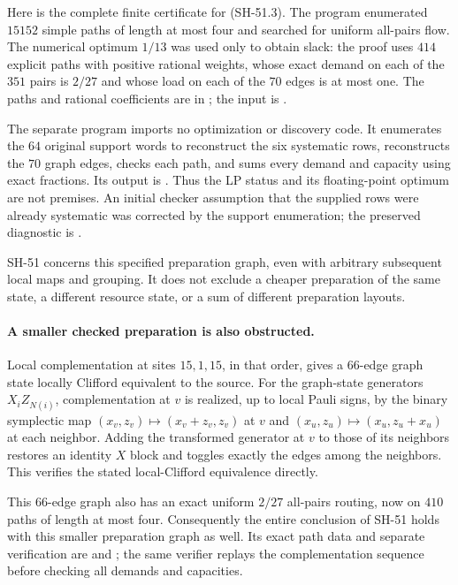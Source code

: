 Here is the complete finite certificate for (SH-51.3).
The program 
enumerated $15152$ simple paths of length at most four and
searched for uniform all-pairs flow.  The numerical optimum
$1/13$ was used only to obtain slack: the proof uses $414$
explicit paths with positive rational weights, whose
exact demand on each of the $351$ pairs is $2/27$ and whose
load on each of the $70$ edges is at most one.  The paths
and rational coefficients are in
; the input is
.

The separate program
imports no optimization or discovery code.  It enumerates
the $64$ original support words to reconstruct the six
systematic rows, reconstructs the $70$ graph edges, checks
each path, and sums every demand and capacity using exact
fractions.  Its output is
.
Thus the LP status and its floating-point optimum are not
premises.  An initial checker assumption that the supplied
rows were already systematic was corrected by the support
enumeration; the preserved diagnostic is
.

SH-51 concerns this specified preparation graph, even with
arbitrary subsequent local maps and grouping.  It does not
exclude a cheaper preparation of the same state, a different
resource state, or a sum of different preparation layouts.

\paragraph{A smaller checked preparation is also obstructed.}
Local complementation at sites $15,1,15$, in that order,
gives a $66$-edge graph state locally Clifford equivalent
to the source.  For the graph-state generators $X_iZ_{N(i)}$,
complementation at $v$ is realized, up to local Pauli signs,
by the binary symplectic map $(x_v,z_v)\mapsto(x_v+z_v,z_v)$
at $v$ and $(x_u,z_u)\mapsto(x_u,z_u+x_u)$ at each neighbor.
Adding the transformed generator at $v$ to those of its
neighbors restores an identity $X$ block and toggles exactly
the edges among the neighbors.  This verifies the stated
local-Clifford equivalence directly.

This $66$-edge graph also has an exact uniform $2/27$
all-pairs routing, now on $410$ paths of length at most four.
Consequently the entire conclusion of SH-51 holds with this
smaller preparation graph as well.  Its exact path data and
separate verification are
 and
;
the same verifier replays the complementation sequence before
checking all demands and capacities.


